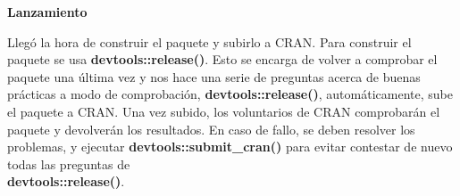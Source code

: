\textbf{Lanzamiento}

Lleg\'o la hora de construir el paquete y subirlo a CRAN. Para construir el paquete
se usa \textbf{devtools::release()}. Esto se encarga de volver a comprobar el paquete una \'ultima
vez y nos hace una serie de preguntas acerca de buenas pr\'acticas a modo de comprobaci\'on,
\textbf{devtools::release()}, autom\'aticamente, sube el paquete a CRAN.
Una vez subido, los voluntarios de CRAN comprobar\'an el paquete y
devolver\'an los resultados.
En caso de fallo, se deben resolver los problemas, y ejecutar \textbf{devtools::submit\_cran()} para evitar contestar de nuevo todas las preguntas de \\
\textbf{devtools::release()}.

\newpage